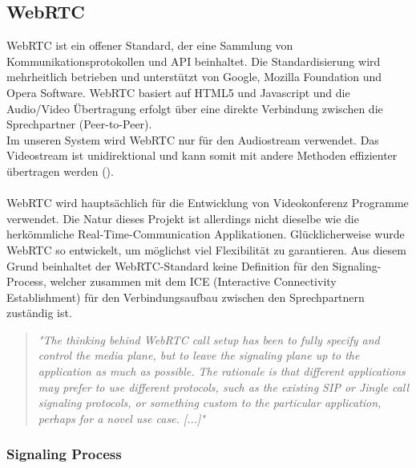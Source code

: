 \subsection{WebRTC}
\label{kap:webrtc}
WebRTC ist ein offener Standard, der eine Sammlung von Kommunikationsprotokollen und API beinhaltet. Die Standardisierung wird mehrheitlich betrieben und unterstützt von Google, Mozilla Foundation und Opera Software. WebRTC basiert auf HTML5 und Javascript und die Audio/Video Übertragung erfolgt über eine direkte Verbindung zwischen die Sprechpartner (Peer-to-Peer).
\\
Im unseren System wird WebRTC nur für den Audiostream verwendet. Das Videostream ist unidirektional und kann somit mit andere Methoden effizienter übertragen werden ().
\\
\\
WebRTC wird hauptsächlich für die Entwicklung von Videokonferenz Programme verwendet. Die Natur dieses Projekt ist allerdings nicht dieselbe wie die herkömmliche Real-Time-Communication Applikationen. Glücklicherweise wurde WebRTC so entwickelt, um möglichst viel Flexibilität zu garantieren. Aus diesem Grund beinhaltet der WebRTC-Standard keine Definition für den Signaling-Process, welcher zusammen mit dem ICE (Interactive Connectivity Establishment) für den Verbindungsaufbau zwischen den Sprechpartnern zuständig ist. 

\begin{quote}
	\textit{
		"The thinking behind WebRTC call setup has been to fully specify and control the media plane, but to leave the signaling plane up to the application as much as possible. The rationale is that different applications may prefer to use different protocols, such as the existing SIP or Jingle call signaling protocols, or something custom to the particular application, perhaps for a novel use case. [...]"
	} 
	\\
	\cite[Sam Dutton, HTML5Rocks.com]{001} 
\end{quote}

\subsubsection{Signaling Process}
\label{kap:signaling}


